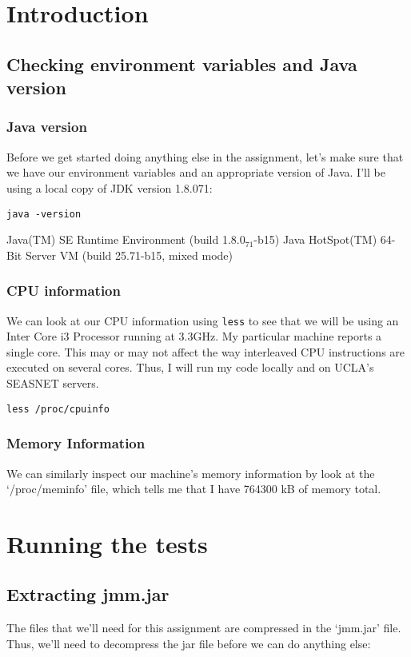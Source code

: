 \documentclass[11pt]{article}
\begin{document}
\section{Introduction}
\label{sec-2}
\subsection{Checking environment variables and Java version}
\label{sec-2-1}
\subsubsection{Java version}
\label{sec-2-1-1}
Before we get started doing anything else in the assignment,
let's make sure that we have our environment variables and
an appropriate version of Java. I'll be using a local copy
of JDK version 1.8.071:

\begin{verbatim}
java -version
\end{verbatim}
Java(TM) SE Runtime Environment (build 1.8.0$_{\text{71}}$-b15)
Java HotSpot(TM) 64-Bit Server VM (build 25.71-b15, mixed mode)
\subsubsection{CPU information}
\label{sec-2-1-2}
We can look at our CPU information using \verb~less~ to see that we will
be using an Inter Core i3 Processor running at 3.3GHz. My particular
machine reports a single core. This may or may not affect the way
interleaved CPU instructions are executed on several cores. Thus,
I will run my code locally and on UCLA's SEASNET servers. 

\begin{verbatim}
less /proc/cpuinfo
\end{verbatim}
\subsubsection{Memory Information}
\label{sec-2-1-3}
We can similarly inspect our machine's memory information by look at
the `/proc/meminfo' file, which tells me that I have 764300 kB of
memory total.
\section{Running the tests}
\label{sec-3}
\subsection{Extracting jmm.jar}
\label{sec-3-1}
The files that we'll need for this assignment are compressed in 
the `jmm.jar' file. Thus, we'll need to decompress the jar file
before we can do anything else:
\end{document}
